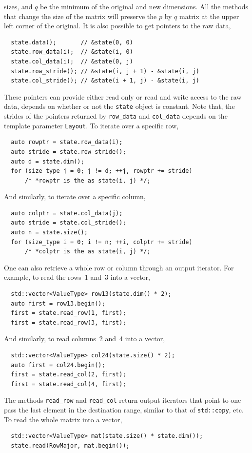 sizes, and $q$ be the minimum of the original and new dimensions. All the
methods that change the size of the matrix will preserve the $p$ by $q$ matrix
at the upper left corner of the original. It is also possible to get pointers
to the raw data,
\begin{Verbatim}
  state.data();       // &state(0, 0)
  state.row_data(i);  // &state(i, 0)
  state.col_data(i);  // &state(0, j)
  state.row_stride(); // &state(i, j + 1) - &state(i, j)
  state.col_stride(); // &state(i + 1, j) - &state(i, j)
\end{Verbatim}
These pointers can provide either read only or read and write access to the raw
data, depends on whether or not the \verb|state| object is constant. Note that,
the strides of the pointers returned by \verb|row_data| and \verb|col_data|
depends on the template parameter \verb|Layout|. To iterate over a specific
row,
\begin{Verbatim}
  auto rowptr = state.row_data(i);
  auto stride = state.row_stride();
  auto d = state.dim();
  for (size_type j = 0; j != d; ++j, rowptr += stride)
      /* *rowptr is the as state(i, j) */;
\end{Verbatim}
And similarly, to iterate over a specific column,
\begin{Verbatim}
  auto colptr = state.col_data(j);
  auto stride = state.col_stride();
  auto n = state.size();
  for (size_type i = 0; i != n; ++i, colptr += stride)
      /* *colptr is the as state(i, j) */;
\end{Verbatim}
One can also retrieve a whole row or column through an output iterator. For
example, to read the rows~1 and~3 into a vector,
\begin{Verbatim}
  std::vector<ValueType> row13(state.dim() * 2);
  auto first = row13.begin();
  first = state.read_row(1, first);
  first = state.read_row(3, first);
\end{Verbatim}
And similarly, to read columns~2 and~4 into a vector,
\begin{Verbatim}
  std::vector<ValueType> col24(state.size() * 2);
  auto first = col24.begin();
  first = state.read_col(2, first);
  first = state.read_col(4, first);
\end{Verbatim}
The methods \verb|read_row| and \verb|read_col| return output iterators that
point to one pass the last element in the destination range, similar to that of
\verb|std::copy|, etc. To read the whole matrix into a vector,
\begin{Verbatim}
  std::vector<ValueType> mat(state.size() * state.dim());
  state.read(RowMajor, mat.begin());
\end{Verbatim}
